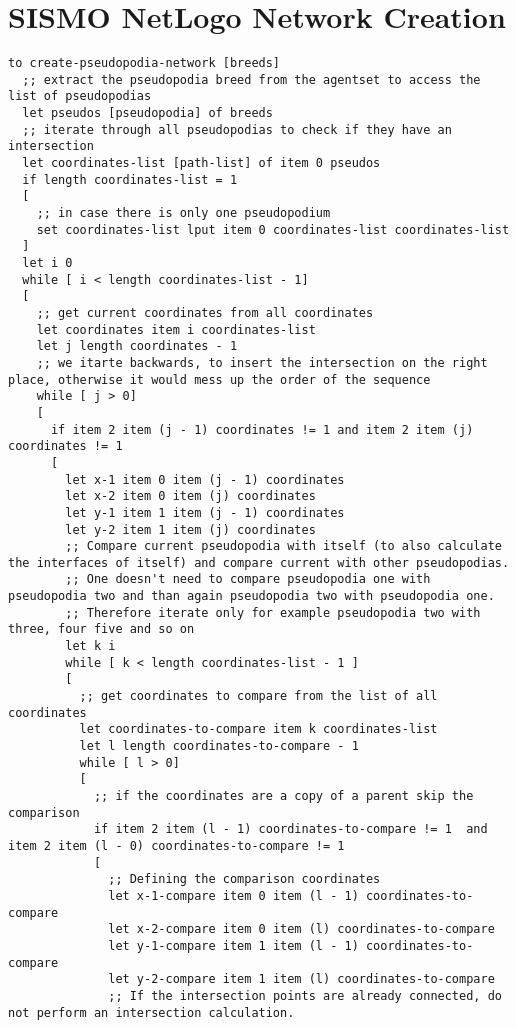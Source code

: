 \section{SISMO NetLogo Network Creation}
\begin{lstlisting}
to create-pseudopodia-network [breeds]
  ;; extract the pseudopodia breed from the agentset to access the list of pseudopodias
  let pseudos [pseudopodia] of breeds
  ;; iterate through all pseudopodias to check if they have an intersection
  let coordinates-list [path-list] of item 0 pseudos
  if length coordinates-list = 1
  [
    ;; in case there is only one pseudopodium
    set coordinates-list lput item 0 coordinates-list coordinates-list
  ]
  let i 0
  while [ i < length coordinates-list - 1]
  [
    ;; get current coordinates from all coordinates
    let coordinates item i coordinates-list
    let j length coordinates - 1
    ;; we itarte backwards, to insert the intersection on the right place, otherwise it would mess up the order of the sequence
    while [ j > 0]
    [
      if item 2 item (j - 1) coordinates != 1 and item 2 item (j) coordinates != 1
      [
        let x-1 item 0 item (j - 1) coordinates
        let x-2 item 0 item (j) coordinates
        let y-1 item 1 item (j - 1) coordinates
        let y-2 item 1 item (j) coordinates
        ;; Compare current pseudopodia with itself (to also calculate the interfaces of itself) and compare current with other pseudopodias.
        ;; One doesn't need to compare pseudopodia one with pseudopodia two and than again pseudopodia two with pseudopodia one.
        ;; Therefore iterate only for example pseudopodia two with three, four five and so on
        let k i       
        while [ k < length coordinates-list - 1 ]
        [
          ;; get coordinates to compare from the list of all coordinates
          let coordinates-to-compare item k coordinates-list
          let l length coordinates-to-compare - 1
          while [ l > 0]
          [
            ;; if the coordinates are a copy of a parent skip the comparison    
            if item 2 item (l - 1) coordinates-to-compare != 1  and item 2 item (l - 0) coordinates-to-compare != 1
            [
              ;; Defining the comparison coordinates
              let x-1-compare item 0 item (l - 1) coordinates-to-compare
              let x-2-compare item 0 item (l) coordinates-to-compare 
              let y-1-compare item 1 item (l - 1) coordinates-to-compare
              let y-2-compare item 1 item (l) coordinates-to-compare
              ;; If the intersection points are already connected, do not perform an intersection calculation.

\end{lstlisting}
